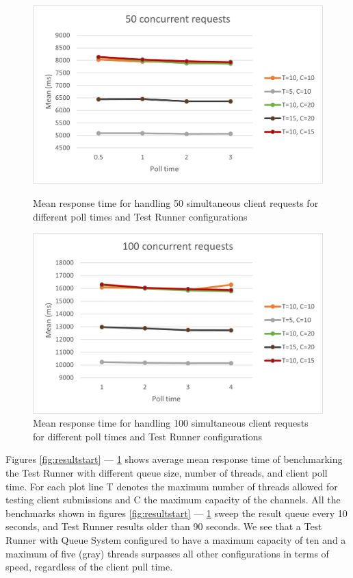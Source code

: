 \begin{figure}[!tbp]
\begin{minipage}[t]{0.4\textwidth}
    \centering
    \includegraphics[scale=0.65]{images/50.png}
    \caption{Mean response time for handling 50 simultaneous client requests for different poll times and Test Runner configurations}
  \end{minipage}
  \hfill
  \begin{minipage}[t]{0.4\textwidth}
    \centering
    \includegraphics[scale=0.65]{images/100.png}
    \caption{Mean response time for handling 100 simultaneous client requests for different poll times and Test Runner configurations}
    \label{fig:resultEnd}
  \end{minipage}
\end{figure}

Figures \ref{fig:resultstart} --- \ref{fig:resultEnd} shows average mean response time of benchmarking the Test Runner with different queue size, number of threads, and client poll time. For each plot line T denotes the maximum number of threads allowed for testing client submissions and C the maximum capacity of the channels. 
All the benchmarks shown in figures \ref{fig:resultstart} --- \ref{fig:resultEnd} sweep the result queue every 10 seconds, and Test Runner results older than 90 seconds.
We see that a Test Runner with Queue System configured to have a maximum capacity of ten and a maximum of five (gray) threads surpasses all other configurations in terms of speed, regardless of the client pull time. 


